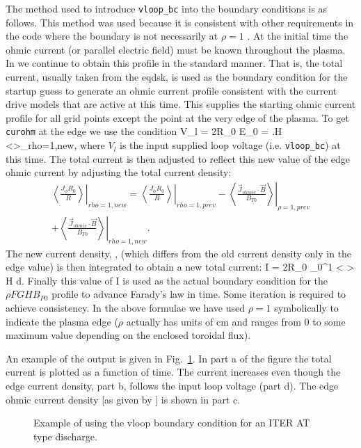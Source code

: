 The method used to introduce \texttt{vloop\_bc} into the boundary conditions is
as follows. This method was used because it is consistent with other
requirements in the code where the boundary is not necessarily at $\rho = 1$ .
At the initial time the ohmic current (or parallel electric field)   must be
known throughout the plasma. In \ot we continue to obtain this profile in the
standard manner. That is, the total current, usually taken from the eqdsk, is
used as the boundary condition for the startup guess to generate an ohmic
current profile consistent with the current drive models that are active at this
time. This supplies the  starting ohmic current profile for all grid points
except the point at the very edge of the plasma. To get \texttt{curohm} at the
edge we use the condition 
\beq 
 \label{ae1} V_l = 2\pi R_0 E_0 = \left.\eta H
 \left<\right>\right\vert_{rho=1,new}, 
\eeq 
where $V_l$ is the input supplied loop voltage (i.e. \texttt{vloop\_bc}) at 
this time. The total current is then adjusted to reflect  this new value of the
edge ohmic current by adjusting the total current density:
\begin{multline}  \label{ae2}
 \left.\left< \frac{J_\phi R_0 }{R}\right>\right\vert_{rho=1,new}= 
 \left.\left< \frac{J_\phi R_0 }{R}\right> \right\vert_{rho=1,prev }
 -\left.\left<\frac{\vec{J}_{ohmic} \cdot \vec{B}}{B_{T0}}\right>
  \right\vert_{\rho =1,prev}
 \\
 +\left.\left<\frac{\vec{J}_{ohmic} \cdot \vec{B}}{B_{T0}}\right>
  \right\vert_{rho=1,new}.
\end{multline}
The new current density, , (which differs from the old
current density only in the edge value) is then integrated to obtain a
new total current:
\beq \label{ae3}
 I = 2\pi R_0 \int_{0}^{1} \left< \right> H \rho d\rho.
\eeq
Finally this value of I is used as the actual boundary condition for
the $\rho FGH B_{P0} $ profile to advance Farady's law in time.
Some iteration is required to achieve consistency. In the above
formulae  we have used $\rho =1 $ symbolically to indicate the plasma
edge ($\rho $ actually has units of cm and ranges from 0 to some
maximum value depending on the enclosed toroidal flux).

An example of the output is given in Fig.~\ref{aefig1}. In part a of the figure
the total current is plotted as a function of time. The current increases even
though the edge current density, part b, follows the input loop voltage (part
d). The edge ohmic current density [as given by ] is shown in part c.
\begin{figure}[hbt] %
 \centering
 \mbox{}
 \caption{Example of using the vloop boundary condition for an ITER
 AT type discharge.}
 \label{aefig1}
\end{figure}
